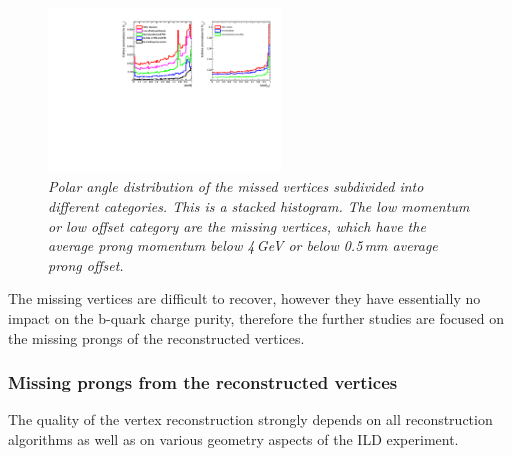 \begin{figure}
	{\centering
		\includegraphics[clip, trim=10.cm 0cm 0.cm 0cm, width=0.55\textwidth]{ILD/plots/missed-cos-vtx.pdf}
		\caption{\sl Polar angle distribution of the missed vertices subdivided into different categories. This is a stacked histogram. The low momentum or low offset category are the missing vertices, which have the average prong momentum below  4\,GeV or below 0.5\,mm average prong offset.
		}
		\label{fig:MissedCos_3}
	}
\end{figure}

The missing vertices are difficult to recover, however they have essentially no impact on the b-quark charge purity, therefore the further studies are focused on the missing prongs of the reconstructed vertices.
\subsubsection{Missing prongs from the reconstructed vertices}
\label{sec:MissingProngs}
The quality of the vertex reconstruction strongly depends on all reconstruction algorithms as well as on various geometry aspects of the ILD experiment. 

